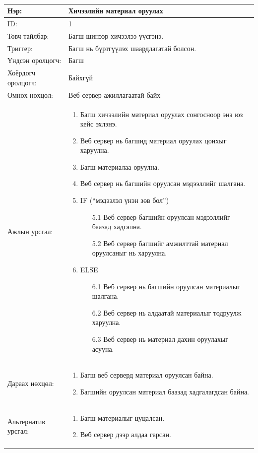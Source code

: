 \begin{center}
	\begin{table}[!htbp]
		\caption{}
		\begin{tabular}{|p{4cm}|p{11cm}|}
			\hline
			Нэр: & Хичээлийн материал оруулах \\
			\hline
			ID: & 1 \\
			\hline
			Товч тайлбар: & Багш шинээр хичээлээ үүсгэнэ. \\
			\hline
			Триггер: & Багш нь бүртгүүлэх шаардлагатай болсон. \\
			\hline
			Үндсэн оролцогч: & Багш \\
			\hline
			Хоёрдогч оролцогч: & Байхгүй  \\
			\hline
			Өмнөх нөхцөл: &  Веб сервер ажиллагаатай байх\\
			\hline
			Ажлын урсгал: & \begin{enumerate}
				\item Багш хичээлийн материал оруулах сонгосноор энэ юз кейс эхлэнэ. 
				\item Веб сервер нь багшид материал оруулах цонхыг харуулна. 
				\item Багш материалаа оруулна. 
				\item Веб сервер нь багшийн оруулсан мэдээллийг шалгана. 
				\item IF (“мэдээлэл үнэн зөв бол”)
				\begin{enumerate}
					\item[5.1] Веб сервер багшийн оруулсан мэдээллийг баазад хадгална.
					\item[5.2] Веб сервер багшийг амжилттай материал оруулсаныг нь харуулна. 
				\end{enumerate}
				\item ELSE
				\begin{enumerate}
					\item[6.1] Веб сервер нь багшийн оруулсан материалыг шалгана.  
					\item[6.2] Веб сервер нь алдаатай материалыг тодруулж харуулна. 
					\item[6.3] Веб сервер нь материал дахин оруулахыг асууна. 
				\end{enumerate}
			\end{enumerate}
			\\					  \hline
			Дараах нөхцөл: &
			\begin{enumerate}
				\item Багш веб серверд материал оруулсан байна. 
				\item Багшийн оруулсан материал баазад хадгалагдсан байна. 
			\end{enumerate}	   
			\\				   \hline
			Альтернатив урсгал: &  \begin{enumerate}
				\item Багш материалыг цуцалсан.
				\item Веб сервер дээр алдаа гарсан. 
			\end{enumerate}
			\\	\hline
		\end{tabular}
	\end{table}
\end{center}

